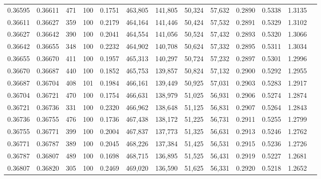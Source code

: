 \begin{tabular}{rrrrrrrrrrrrr}
0.36595 & 0.36611 &   471 & 100 &                                     0.1751 & 463,805 & 141,805 &  50,324 &  57,632 & 0.2890 & 0.5338 & 1.3135 \\
0.36611 & 0.36627 &   359 & 100 &                                     0.2179 & 464,164 & 141,446 &  50,424 &  57,532 & 0.2891 & 0.5329 & 1.3102 \\
0.36627 & 0.36642 &   390 & 100 &                                     0.2041 & 464,554 & 141,056 &  50,524 &  57,432 & 0.2893 & 0.5320 & 1.3066 \\
0.36642 & 0.36655 &   348 & 100 &                                     0.2232 & 464,902 & 140,708 &  50,624 &  57,332 & 0.2895 & 0.5311 & 1.3034 \\
0.36655 & 0.36670 &   411 & 100 &                                     0.1957 & 465,313 & 140,297 &  50,724 &  57,232 & 0.2897 & 0.5301 & 1.2996 \\
0.36670 & 0.36687 &   440 & 100 &                                     0.1852 & 465,753 & 139,857 &  50,824 &  57,132 & 0.2900 & 0.5292 & 1.2955 \\
0.36687 & 0.36704 &   408 & 101 &                                     0.1984 & 466,161 & 139,449 &  50,925 &  57,031 & 0.2903 & 0.5283 & 1.2917 \\
0.36704 & 0.36721 &   470 & 100 &                                     0.1754 & 466,631 & 138,979 &  51,025 &  56,931 & 0.2906 & 0.5274 & 1.2874 \\
0.36721 & 0.36736 &   331 & 100 &                                     0.2320 & 466,962 & 138,648 &  51,125 &  56,831 & 0.2907 & 0.5264 & 1.2843 \\
0.36736 & 0.36755 &   476 & 100 &                                     0.1736 & 467,438 & 138,172 &  51,225 &  56,731 & 0.2911 & 0.5255 & 1.2799 \\
0.36755 & 0.36771 &   399 & 100 &                                     0.2004 & 467,837 & 137,773 &  51,325 &  56,631 & 0.2913 & 0.5246 & 1.2762 \\
0.36771 & 0.36787 &   389 & 100 &                                     0.2045 & 468,226 & 137,384 &  51,425 &  56,531 & 0.2915 & 0.5236 & 1.2726 \\
0.36787 & 0.36807 &   489 & 100 &                                     0.1698 & 468,715 & 136,895 &  51,525 &  56,431 & 0.2919 & 0.5227 & 1.2681 \\
0.36807 & 0.36820 &   305 & 100 &                                     0.2469 & 469,020 & 136,590 &  51,625 &  56,331 & 0.2920 & 0.5218 & 1.2652 \\

\end{tabular}
